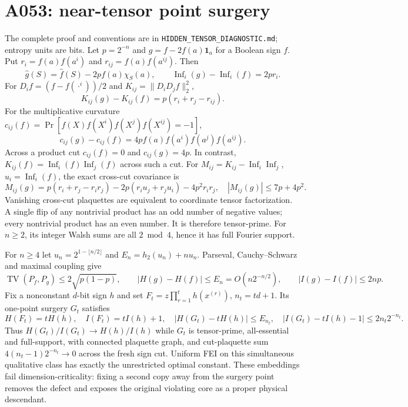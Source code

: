 \documentclass{article}
\begin{document}
\section*{A053: near-tensor point surgery}
The complete proof and conventions are in \texttt{HIDDEN\_TENSOR\_DIAGNOSTIC.md}; entropy units are bits. Let $p=2^{-n}$ and $g=f-2f(a)\mathbf1_a$ for a Boolean sign $f$. Put $r_i=f(a)f(a^i)$ and $r_{ij}=f(a)f(a^{ij})$. Then
\[
\widehat g(S)=\widehat f(S)-2pf(a)\chi_S(a),\qquad
\operatorname{Inf}_i(g)-\operatorname{Inf}_i(f)=2pr_i.
\]
For $D_i f=(f-f(\cdot^i))/2$ and $K_{ij}=\|D_iD_jf\|_2^2$,
\[
K_{ij}(g)-K_{ij}(f)=p(r_i+r_j-r_{ij}).
\]
For the multiplicative curvature $c_{ij}(f)=\Pr[f(X)f(X^i)f(X^j)f(X^{ij})=-1]$,
\[
c_{ij}(g)-c_{ij}(f)=4p f(a)f(a^i)f(a^j)f(a^{ij}).
\]
Across a product cut $c_{ij}(f)=0$ and $c_{ij}(g)=4p$. In contrast, $K_{ij}(f)=\operatorname{Inf}_i(f)\operatorname{Inf}_j(f)$ across such a cut. For $M_{ij}=K_{ij}-\operatorname{Inf}_i\operatorname{Inf}_j$, $u_i=\operatorname{Inf}_i(f)$, the exact cross-cut covariance is
\[
M_{ij}(g)=p(r_i+r_j-r_ir_j)-2p(r_iu_j+r_ju_i)-4p^2r_ir_j,
\quad |M_{ij}(g)|\le7p+4p^2.
\]
Vanishing cross-cut plaquettes are equivalent to coordinate tensor factorization. A single flip of any nontrivial product has an odd number of negative values; every nontrivial product has an even number. It is therefore tensor-prime. For $n\ge2$, its integer Walsh sums are all $2\bmod4$, hence it has full Fourier support.

For $n\ge4$ let $u_n=2^{1-\lfloor n/2\rfloor}$ and $E_n=h_2(u_n)+nu_n$. Parseval, Cauchy--Schwarz and maximal coupling give
\[
\operatorname{TV}(P_f,P_g)\le2\sqrt{p(1-p)},\qquad
|H(g)-H(f)|\le E_n=O(n2^{-n/2}),\qquad
|I(g)-I(f)|\le2np.
\]
Fix a nonconstant $d$-bit sign $h$ and set $F_t=z\prod_{r=1}^t h(x^{(r)})$, $n_t=td+1$. Its one-point surgery $G_t$ satisfies
\[
H(F_t)=tH(h),\quad I(F_t)=tI(h)+1,\quad
|H(G_t)-tH(h)|\le E_{n_t},\quad
|I(G_t)-tI(h)-1|\le2n_t2^{-n_t}.
\]
Thus $H(G_t)/I(G_t)\to H(h)/I(h)$ while $G_t$ is tensor-prime, all-essential and full-support, with connected plaquette graph, and cut-plaquette sum $4(n_t-1)2^{-n_t}\to0$ across the fresh sign cut. Uniform FEI on this simultaneous qualitative class has exactly the unrestricted optimal constant. These embeddings fail dimension-criticality: fixing a second copy away from the surgery point removes the defect and exposes the original violating core as a proper physical descendant.
\end{document}
